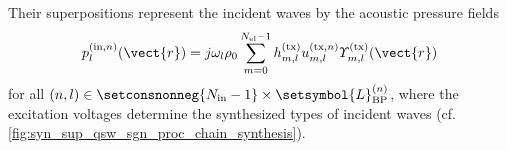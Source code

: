 Their superpositions represent
the incident waves by
the acoustic pressure fields
\begin{equation}
  p_{l}^{(\text{in}, n)}( \vect{r} )
  =
  j \omega_{l} \rho_{0}
  \sum_{ m = 0 }^{ N_{\text{el}} - 1 }
    h_{m, l}^{(\text{tx})}
    u_{m, l}^{(\text{tx}, n)}
    \varUpsilon_{m, l}^{(\text{tx})}( \vect{r} )
 \label{eqn:syn_sup_qsw_p_in}
\end{equation}
for
all $( n, l ) \in \setconsnonneg{ N_{\text{in}} - 1 } \times \setsymbol{L}_{ \text{BP} }^{(n)}$, where
the excitation voltages determine
the synthesized types of
incident waves
(cf. \cref{fig:syn_sup_qsw_sgn_proc_chain_synthesis}).

